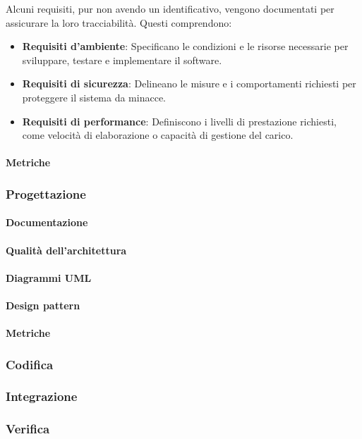 Alcuni requisiti, pur non avendo un identificativo, vengono documentati per assicurare la loro tracciabilità. Questi comprendono:
\begin{itemize}
    \item \textbf{Requisiti d’ambiente}: Specificano le condizioni e le risorse necessarie per sviluppare, testare e implementare il software.
    \item \textbf{Requisiti di sicurezza}: Delineano le misure e i comportamenti richiesti per proteggere il sistema da minacce.
    \item \textbf{Requisiti di performance}: Definiscono i livelli di prestazione richiesti, come velocità di elaborazione o capacità di gestione del carico.
\end{itemize}

\paragraph{Metriche}

\subsubsection{Progettazione}
\paragraph{Documentazione}
\paragraph{Qualità dell'architettura}
\paragraph{Diagrammi UML}
\paragraph{Design pattern}
\paragraph{Metriche}

\subsubsection{Codifica}

\subsubsection{Integrazione}

\subsubsection{Verifica}


